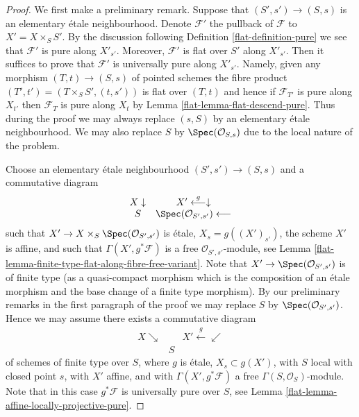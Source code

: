 \begin{proof}

We first make a preliminary remark. Suppose that $(S', s') \to (S, s)$
is an elementary \'etale neighbourhood. Denote $\mathcal{F}'$ the
pullback of $\mathcal{F}$ to $X' = X \times_S S'$.
By the discussion following
Definition \ref{flat-definition-pure}
we see that $\mathcal{F}'$ is pure along $X'_{s'}$. Moreover, $\mathcal{F}'$
is flat over $S'$ along $X'_{s'}$. Then it suffices to prove
that $\mathcal{F}'$ is universally pure along $X'_{s'}$. Namely, given
any morphism $(T, t) \to (S, s)$ of pointed schemes
the fibre product $(T', t') = (T \times_S S', (t, s'))$ is flat over $(T, t)$
and hence if $\mathcal{F}_{T'}$ is pure along $X_{t'}$ then
$\mathcal{F}_T$ is pure along $X_t$ by
Lemma \ref{flat-lemma-flat-descend-pure}.
Thus during the proof we may always replace $(s, S)$ by an elementary
\'etale neighbourhood.
We may also replace $S$ by $\Spec(\mathcal{O}_{S, s})$
due to the local nature of the problem.

\medskip\noindent
Choose an elementary \'etale neighbourhood $(S', s') \to (S, s)$ and
a commutative diagram
$$
\begin{array}{cc}X \downarrow & X' \overset{g}{\longleftarrow}\downarrow \\ S & \Spec(\mathcal{O}_{S', s'}) \longleftarrow\end{array}
$$
such that $X' \to X \times_S \Spec(\mathcal{O}_{S', s'})$
is \'etale, $X_s = g((X')_{s'})$, the scheme $X'$ is affine,
and such that $\Gamma(X', g^*\mathcal{F})$ is a free
$\mathcal{O}_{S', s'}$-module, see
Lemma \ref{flat-lemma-finite-type-flat-along-fibre-free-variant}.
Note that $X' \to \Spec(\mathcal{O}_{S', s'})$ is of finite type
(as a quasi-compact morphism which is the composition of an \'etale morphism
and the base change of a finite type morphism).
By our preliminary remarks in the first paragraph of the proof
we may replace $S$ by $\Spec(\mathcal{O}_{S', s'})$. Hence
we may assume there exists a commutative diagram
$$
\begin{array}{ccc}X \searrow &  & X' \overset{g}{\longleftarrow}\swarrow \\  & S & \end{array}
$$
of schemes of finite type over $S$, where $g$ is \'etale, $X_s \subset g(X')$,
with $S$ local with closed point $s$, with $X'$ affine, and with
$\Gamma(X', g^*\mathcal{F})$ a free $\Gamma(S, \mathcal{O}_S)$-module.
Note that in this case $g^*\mathcal{F}$ is universally pure over $S$, see
Lemma \ref{flat-lemma-affine-locally-projective-pure}.


\end{proof}

